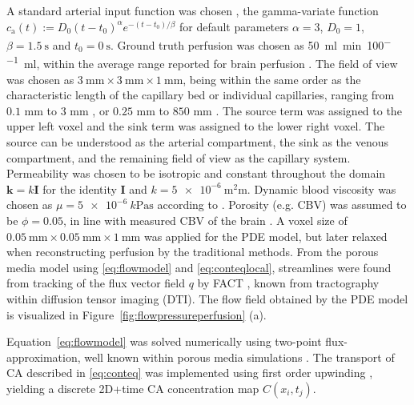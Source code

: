 \documentclass[journal,twocolumn]{IEEEtran}
\newcommand{\ca}{c_\mathrm{a}}
\newcommand{\simu}{k\pascal\second}
\newcommand{\siPml}{\milli\litre\per\minute\per100\milli\litre}
\begin{document}
	A standard arterial input function was chosen \cite{ostergaard96}, the gamma-variate function $\ca(t) := D_0(t-t_0)^\alpha e^{-(t-t_0)/\beta}$ for default parameters $\alpha=3$, $D_0 = 1$, $\beta = \SI{1.5}{\second}$ and $t_0 = \SI{0}{\second}$.
	Ground truth perfusion was chosen as \SI{50}{\siPml}, within the average range reported for brain perfusion \cite{Obrist1984,Smith00}. The field of view was chosen as $\SI{3}{\milli\meter}\times\SI{3}{\milli\meter}\times\SI{1}{\milli\meter}$, being within the same order as the characteristic length of the capillary bed or individual capillaries, ranging from $0.1$ mm to $3$ mm \cite{Cho2011}, or $0.25$ mm to $850$ mm \cite{Townsley2012}.
	The source term was assigned to the upper left voxel and the sink term was assigned to the lower right voxel. The source can be understood as the arterial compartment, the sink as the venous compartment, and the remaining field of view as the capillary system. 
	Permeability was chosen to be isotropic and constant throughout the domain $\mathbf{k}=k\mathbf{I}$ for the identity $\mathbf{I}$ and $k=\SI{5e-6}{\square\milli\meter}$.
	Dynamic blood viscosity was chosen as $\mu=\SI{5e-6}{\simu}$ according to \cite{rosencranz06}.
	Porosity (e.g. CBV) was assumed to be $\phi = 0.05$, in line with measured CBV of the brain \cite{Smith00}.
A voxel size of $\SI{0.05}{\milli\meter} \times\SI{0.05}{\milli\meter}\times\SI{1}{\milli\meter}$ was applied for the PDE model, but later relaxed when reconstructing perfusion by the traditional methods. From the porous media model using \eqref{eq:flowmodel} and \eqref{eq:conteqlocal}, streamlines were found from tracking of the flux vector field $q$ by FACT \cite{Mori1998}, known from  tractography within diffusion tensor imaging (DTI). 
	The flow field obtained by the PDE model is visualized in Figure~\ref{fig:flowpressureperfusion} (a).
	
	Equation~\eqref{eq:flowmodel} was solved numerically using two-point flux-approximation, well known within porous media simulations \cite{Aarnes2007}.
	The transport of CA described in \eqref{eq:conteq} was implemented using first order upwinding \cite{Patankar80}, yielding a discrete 2D+time CA concentration map $C(x_i,t_j)$.
		
\end{document}
